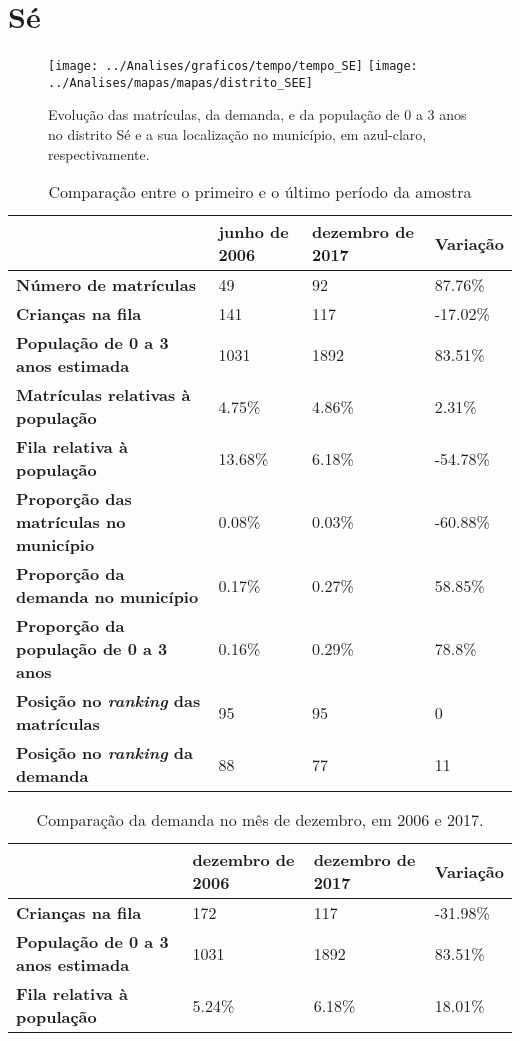 \section{Sé}
\begin{figure}[H]
\centering
\texttt{[image: ../Analises/graficos/tempo/tempo\_SE]}
\texttt{[image: ../Analises/mapas/mapas/distrito\_SEE]}
\caption{Evolução das matrículas, da demanda, e da população de 0 a 3 anos no distrito Sé e a sua localização no município, em azul-claro, respectivamente.}
\end{figure}
\begin{table}[H]
\begin{tabular}{l|l|l|l}
\textbf{}                                      & \textbf{junho de 2006}       & \textbf{dezembro de 2017}    & \textbf{Variação} \\ \hline
\textbf{Número de matrículas}                  & 49 & 92 & 87.76\% \\ \hline
\textbf{Crianças na fila}                      & 141 & 117 & -17.02\% \\ \hline
\textbf{População de 0 a 3 anos estimada}      & 1031 & 1892 & 83.51\% \\ \hline
\textbf{Matrículas relativas à população}      & 4.75\% & 4.86\% & 2.31\% \\ \hline
\textbf{Fila relativa à população}             & 13.68\% & 6.18\% & -54.78\% \\ \hline
\textbf{Proporção das matrículas no município} & 0.08\% & 0.03\% & -60.88\% \\ \hline
\textbf{Proporção da demanda no município}     & 0.17\% & 0.27\% & 58.85\% \\ \hline
\textbf{Proporção da população de 0 a 3 anos}  & 0.16\% & 0.29\% & 78.8\% \\ \hline
\textbf{Posição no \textit{ranking} das matrículas}     & 95 & 95 & 0 \\ \hline
\textbf{Posição no \textit{ranking} da demanda}         & 88 & 77 & 11 \\ 
\end{tabular}
\caption{Comparação entre o primeiro e o último período da amostra}
\end{table}
\begin{table}[H]
\begin{tabular}{l|l|l|l}
\textbf{}                                 & \textbf{dezembro de 2006} & \textbf{dezembro de 2017} & \textbf{Variação} \\ \hline
\textbf{Crianças na fila}                      & 172 & 117 & -31.98\% \\ \hline
\textbf{População de 0 a 3 anos estimada}      & 1031 & 1892 & 83.51\% \\ \hline
\textbf{Fila relativa à população}             & 5.24\% & 6.18\% & 18.01\% \\
\end{tabular}
\caption{Comparação da demanda no mês de dezembro, em 2006 e 2017.}
\end{table}
